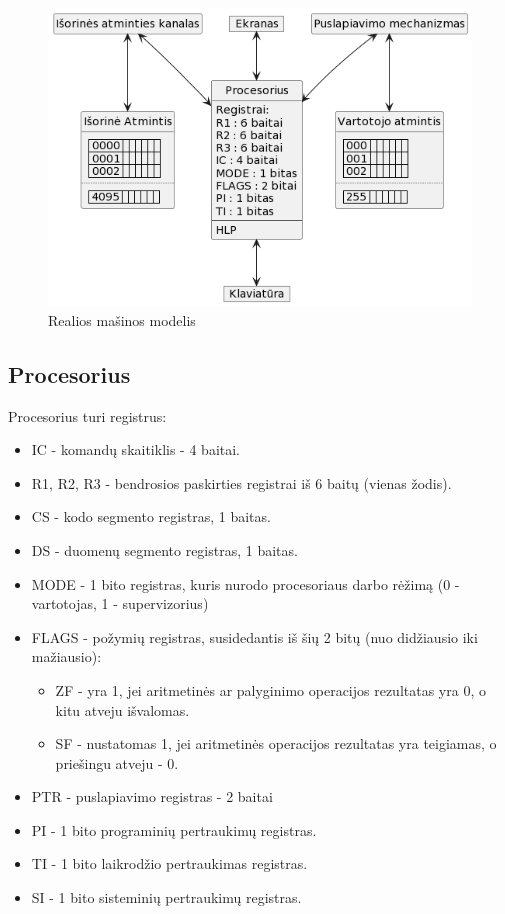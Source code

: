 \documentclass{VUMIFInfKursinis}
\begin{document}
\begin{figure}[H]
	\centering	
	\includegraphics[scale=0.65]{img/reali_masina}
	\caption{Realios mašinos modelis}   %
	\label{img:reali_masina}
\end{figure}

\subsection{Procesorius}

Procesorius turi registrus:

\begin{itemize}
	\item IC - komandų skaitiklis - 4 baitai.
	\item R1, R2, R3 - bendrosios paskirties registrai iš 6 baitų (vienas žodis).
	\item CS - kodo segmento registras, 1 baitas.
	\item DS - duomenų segmento registras, 1 baitas.
	\item MODE - 1 bito registras, kuris nurodo procesoriaus darbo rėžimą (0 - vartotojas, 1 - supervizorius)
	\item FLAGS - požymių  registras, susidedantis iš šių 2 bitų (nuo didžiausio iki mažiausio): 
	\begin{itemize}
		\item ZF - yra 1, jei aritmetinės ar palyginimo operacijos rezultatas yra 0, o kitu atveju išvalomas.
		\item SF - nustatomas 1, jei aritmetinės operacijos rezultatas yra teigiamas, o priešingu atveju - 0.
	\end{itemize}
	\item PTR - puslapiavimo registras - 2 baitai
	\item PI - 1 bito programinių pertraukimų registras.
	\item TI - 1 bito laikrodžio pertraukimas registras.
	\item SI - 1 bito sisteminių pertraukimų registras.
\end{itemize}
\end{document}

